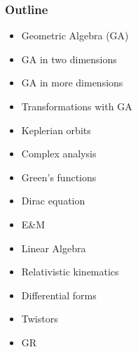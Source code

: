 \documentclass[12pt,xcolor={dvipsnames}]{beamer}
\begin{document}
\begin{frame}
  \frametitle{Outline}
  \begin{itemize}
   \item Geometric Algebra (GA)
   \item GA in two dimensions
   \item GA in more dimensions
   \item Transformations with GA
   \item Keplerian orbits
   \item Complex analysis
   \item Green's functions
   \item Dirac equation
   \item E\&M \pause
   \item Linear Algebra
   \item Relativistic kinematics
   \item Differential forms
   \item Twistors
   \item GR
  \end{itemize}
\end{frame}


\end{document}
